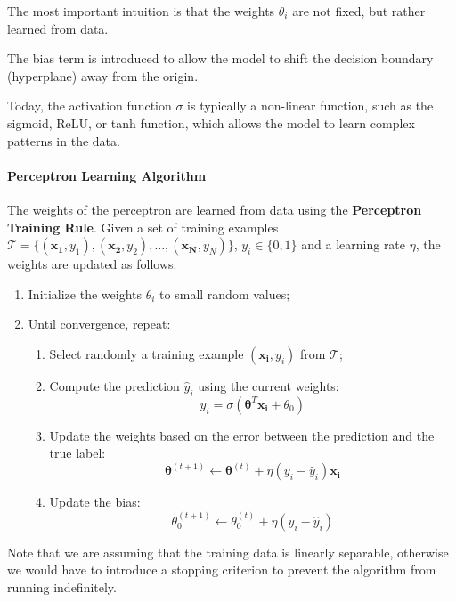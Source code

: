 The most important intuition is that the weights $\theta_i$ are not fixed, but rather learned from data.

The bias term is introduced to allow the model to shift the decision boundary (hyperplane) away from the origin.

Today, the activation function $\sigma$ is typically a non-linear function, such as the sigmoid, ReLU, or tanh function,
which allows the model to learn complex patterns in the data.

\paragraph{Perceptron Learning Algorithm}
\label{perceptron-training}
The weights of the perceptron are learned from data using the \textbf{Perceptron Training Rule}.
Given a set of training examples $\mathcal{T} = \{(\boldsymbol{x_1}, y_1), (\boldsymbol{x_2}, y_2), \ldots, (\boldsymbol{x_N}, y_N)\}$, $y_i \in \{0, 1\}$
and a learning rate $\eta$, the weights are updated as follows:
\begin{enumerate}
    \item Initialize the weights $\theta_i$ to small random values;
    \item Until convergence, repeat:
    \begin{enumerate}
        \item Select randomly a training example $(\boldsymbol{x_i}, y_i)$ from $\mathcal{T}$;
        \item Compute the prediction $\hat{y}_i$ using the current weights:
        \[ \hat{y}_i = \sigma\left(\boldsymbol{\theta}^T \boldsymbol{x_i} + \theta_0 \right) \]
        \item Update the weights based on the error between the prediction and the true label:
        \[ \boldsymbol{\theta}^{(t+1)} \leftarrow \boldsymbol{\theta}^{(t)} + \eta (y_i - \hat{y}_i) \boldsymbol{x_i} \]
        \item Update the bias:
        \[ \theta_0^{(t+1)} \leftarrow \theta_0^{(t)} + \eta (y_i - \hat{y}_i) \]
    \end{enumerate}
\end{enumerate}
Note that we are assuming that the training data is linearly separable, otherwise we would have to introduce a stopping criterion to prevent the algorithm from running indefinitely.

